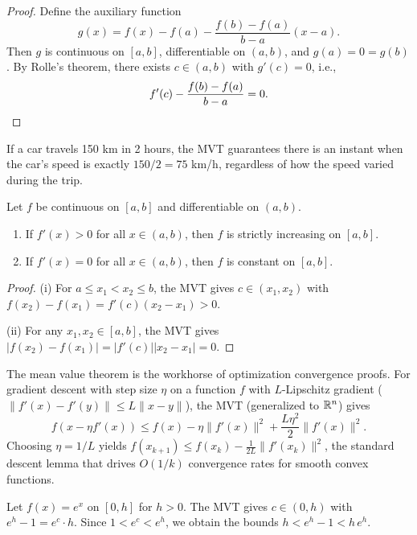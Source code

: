 \documentclass[11pt,a4paper]{article}
\begin{document}
\begin{proof}
Define the auxiliary function
\[
  g(x) = f(x) - f(a) - \frac{f(b) - f(a)}{b - a}(x - a).
\]
Then $g$ is continuous on $[a, b]$, differentiable on $(a, b)$, and
$g(a) = 0 = g(b)$. By Rolle's theorem, there exists $c \in (a, b)$
with $g'(c) = 0$, i.e.,
\[
  f'(c) - \frac{f(b) - f(a)}{b - a} = 0. \qedhere
\]
\end{proof}

\begin{example}
\label{ex:mvt_speed}
If a car travels 150 km in 2 hours, the MVT guarantees there is an
instant when the car's speed is exactly $150/2 = 75$ km/h, regardless
of how the speed varied during the trip.
\end{example}

\begin{corollary}
\label{cor:monotone_deriv}
Let $f$ be continuous on $[a, b]$ and differentiable on $(a, b)$.
\begin{enumerate}[nosep,label=(\roman*)]
  \item If $f'(x) > 0$ for all $x \in (a, b)$, then $f$ is strictly
    increasing on $[a, b]$.
  \item If $f'(x) = 0$ for all $x \in (a, b)$, then $f$ is constant on
    $[a, b]$.
\end{enumerate}
\end{corollary}

\begin{proof}
(i) For $a \le x_1 < x_2 \le b$, the MVT gives $c \in (x_1, x_2)$ with
$f(x_2) - f(x_1) = f'(c)(x_2 - x_1) > 0$.

(ii) For any $x_1, x_2 \in [a, b]$, the MVT gives
$|f(x_2) - f(x_1)| = |f'(c)||x_2 - x_1| = 0$.
\end{proof}

\begin{rlconnection}[title={MVT in optimization convergence analysis}]
The mean value theorem is the workhorse of optimization convergence
proofs. For gradient descent with step size $\eta$ on a function $f$
with $L$-Lipschitz gradient ($\|f'(x) - f'(y)\| \le L\|x-y\|$), the
MVT (generalized to $\mathbb{R}^n$) gives
\[
  f(x - \eta f'(x)) \le f(x) - \eta \|f'(x)\|^2
  + \frac{L\eta^2}{2}\|f'(x)\|^2.
\]
Choosing $\eta = 1/L$ yields $f(x_{k+1}) \le f(x_k) -
\frac{1}{2L}\|f'(x_k)\|^2$, the standard descent lemma that drives
$O(1/k)$ convergence rates for smooth convex functions.
\end{rlconnection}

\begin{example}
\label{ex:mvt_bound}
Let $f(x) = e^x$ on $[0, h]$ for $h > 0$. The MVT gives $c \in (0, h)$
with $e^h - 1 = e^c \cdot h$. Since $1 < e^c < e^h$, we obtain the
bounds $h < e^h - 1 < h\,e^h$.
\end{example}
\end{document}
